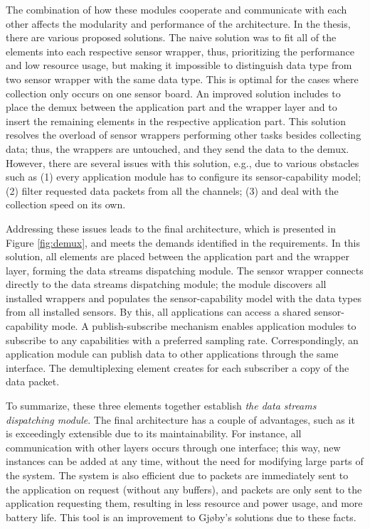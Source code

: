 The combination of how these modules cooperate and communicate with each other affects the modularity and performance of the architecture. In the thesis, there are various proposed solutions. The naive solution was to fit all of the elements into each respective sensor wrapper, thus, prioritizing the performance and low resource usage, but making it impossible to distinguish data type from two sensor wrapper with the same data type. This is optimal for the cases where collection only occurs on one sensor board. An improved solution includes to place the demux between the application part and the wrapper layer and to insert the remaining elements in the respective application part. This solution resolves the overload of sensor wrappers performing other tasks besides collecting data; thus, the wrappers are untouched, and they send the data to the demux. However, there are several issues with this solution, e.g., due to various obstacles such as (1) every application module has to configure its sensor-capability model; (2) filter requested data packets from all the channels; (3) and deal with the collection speed on its own.

Addressing these issues leads to the final architecture, which is presented in Figure \ref{fig:demux}, and meets the demands identified in the requirements. In this solution, all elements are placed between the application part and the wrapper layer, forming the data streams dispatching module. The sensor wrapper connects directly to the data streams dispatching module; the module discovers all installed wrappers and populates the sensor-capability model with the data types from all installed sensors. By this, all applications can access a shared sensor-capability mode. A publish-subscribe mechanism enables application modules to subscribe to any capabilities with a preferred sampling rate. Correspondingly, an application module can publish data to other applications through the same interface. The demultiplexing element creates for each subscriber a copy of the data packet. 

To summarize, these three elements together establish \textit{the data streams dispatching module}. The final architecture has a couple of advantages, such as it is exceedingly extensible due to its maintainability. For instance, all communication with other layers occurs through one interface; this way, new instances can be added at any time, without the need for modifying large parts of the system. The system is also efficient due to packets are immediately sent to the application on request (without any buffers), and packets are only sent to the application requesting them, resulting in less resource and power usage, and more battery life. This tool is an improvement to Gjøby's solutions due to these facts.
